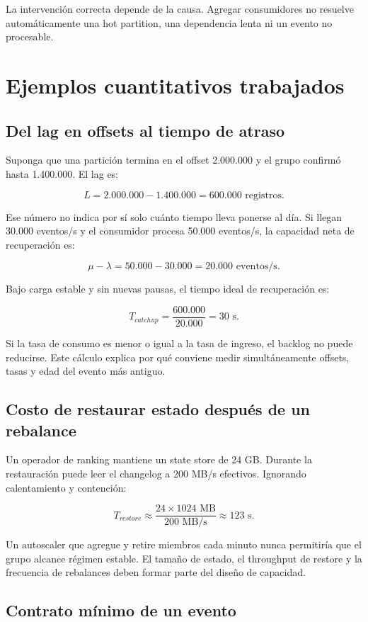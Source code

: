 \documentclass[variant=apuntes,cover=institutional,mode=screen]{ua-engineering-v6-article}
\begin{document}
La intervención correcta depende de la causa. Agregar consumidores no resuelve automáticamente una hot partition, una dependencia lenta ni un evento no procesable.


\section{Ejemplos cuantitativos trabajados}

\subsection{Del lag en offsets al tiempo de atraso}

Suponga que una partición termina en el offset 2.000.000 y el grupo confirmó hasta 1.400.000. El lag es:

\[
L=2.000.000-1.400.000=600.000\text{ registros}.
\]

Ese número no indica por sí solo cuánto tiempo lleva ponerse al día. Si llegan 30.000 eventos/s y el consumidor procesa 50.000 eventos/s, la capacidad neta de recuperación es:

\[
\mu-\lambda=50.000-30.000=20.000\text{ eventos/s}.
\]

Bajo carga estable y sin nuevas pausas, el tiempo ideal de recuperación es:

\[
T_{catchup}=\frac{600.000}{20.000}=30\text{ s}.
\]

Si la tasa de consumo es menor o igual a la tasa de ingreso, el backlog no puede reducirse. Este cálculo explica por qué conviene medir simultáneamente offsets, tasas y edad del evento más antiguo.

\subsection{Costo de restaurar estado después de un rebalance}

Un operador de ranking mantiene un state store de 24 GB. Durante la restauración puede leer el changelog a 200 MB/s efectivos. Ignorando calentamiento y contención:

\[
T_{restore}\approx\frac{24\times1024\text{ MB}}{200\text{ MB/s}}\approx123\text{ s}.
\]

Un autoscaler que agregue y retire miembros cada minuto nunca permitiría que el grupo alcance régimen estable. El tamaño de estado, el throughput de restore y la frecuencia de rebalances deben formar parte del diseño de capacidad.

\subsection{Contrato mínimo de un evento}
\end{document}
